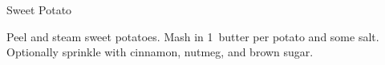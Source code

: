 
\begin{recipe}{Sweet Potato}%
  \workload{}
  \time{}
  \yield{}
  \servings{}
  \source{}
  \maketitle

  Peel and steam sweet potatoes. Mash in 1~\T butter per potato and some
  salt. Optionally sprinkle with cinnamon, nutmeg, and brown sugar.
\end{recipe}

